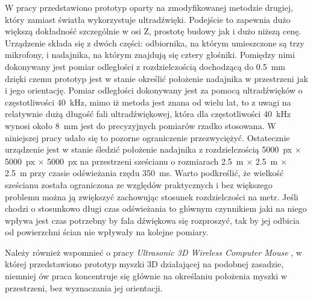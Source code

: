  W pracy przedstawiono prototyp oparty na zmodyfikowanej metodzie drugiej, który zamiast światła wykorzystuje ultradźwięki. 
 Podejście to zapewnia dużo większą dokładność szczególnie w osi Z, prostotę budowy jak i dużo niższą cenę.
 Urządzenie składa się z dwóch części: odbiornika, na którym umieszczone są trzy mikrofony, i nadajnika,
 na którym znajdują się cztery głośniki. Pomiędzy nimi dokonywany jest pomiar odległości z rozdzielczością
 dochodzącą do \SI{0,5}{mm} dzięki czemu prototyp jest w stanie określić położenie nadajnika
w przestrzeni jak i jego orientację. 
Pomiar odległości dokonywany jest za pomocą ultradźwięków o częstotliwości \SI{40}{kHz},
mimo iż metoda jest znana od wielu lat, to z uwagi na relatywnie dużą długość fali ultradźwiękowej,
która dla częstotliwości \SI{40}{kHz} wynosi około \SI{8}{mm} jest do precyzyjnych pomiarów rzadko stosowana.
W niniejszej pracy udało się to pozorne ograniczenie przezwyciężyć.
Ostatecznie urządzenie jest w stanie śledzić położenie nadajnika z rozdzielczością 
\SI{5000}{px} $\times$ \SI{5000}{px} $\times$ \SI{5000}{px} na przestrzeni sześcianu o rozmiarach 
\SI{2,5}{m} $\times$ \SI{2,5}{m}  $\times$ \SI{2,5}{m} przy czasie odświeżania rzędu \SI{350}{ms}.
Warto podkreślić, że wielkość sześcianu została ograniczona ze względów praktycznych i bez 
większego problemu można ją zwiększyć zachowując stosunek rozdzielczości na metr.
Jeśli chodzi o stosunkowo długi czas odświeżania to
 głównym czynnikiem jaki na niego wpływa jest czas potrzebny by fala dźwiękowa się rozproszyć,
 tak by jej odbicia od powierzchni ścian nie wpływały na kolejne pomiary.

 Należy również wspomnieć o pracy \textit{Ultrasonic 3D Wireless Computer Mouse} \cite{bib:mouse}, w której przedstawiono 
 prototyp myszki 3D działającej na podobnej zasadzie, niemniej ów praca koncentruje się głównie 
 na określaniu położenia myszki w przestrzeni, bez wyznaczania jej orientacji.




   